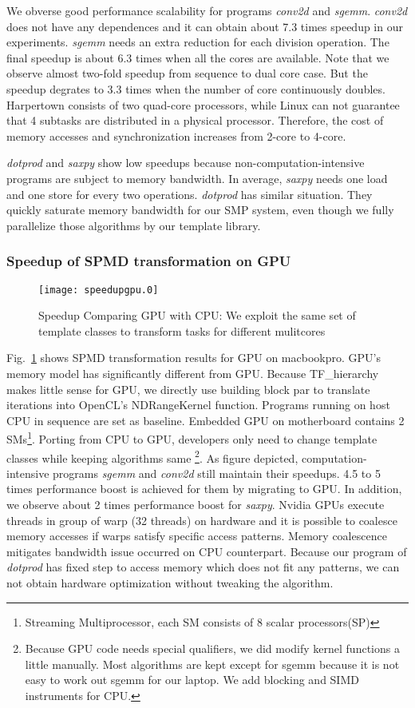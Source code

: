 We obverse good performance scalability for programs
\textit{conv2d} and \textit{sgemm}. \textit{conv2d} does not have any dependences
and it can obtain about 7.3 times speedup in our experiments. \textit{sgemm}
needs an extra reduction for each division operation. The final
speedup is about 6.3 times when all the cores are available. Note that we
observe almost two-fold speedup from sequence to dual core case. But
the speedup degrates to 3.3 times when the number of core continuously
doubles. Harpertown consists of two quad-core processors,  while Linux
can not guarantee that 4 subtasks are distributed in a physical
processor. Therefore, the cost of memory accesses and synchronization
increases from 2-core to 4-core.

\textit{dotprod} and \textit{saxpy} show low speedups because non-computation-intensive
programs are subject to memory bandwidth.  In average, \textit{saxpy} needs one load and one 
store for every two operations. \textit{dotprod} has similar
situation. They quickly saturate memory bandwidth for our SMP system, even though we fully parallelize those
algorithms by our template library. 

\subsubsection{Speedup of  SPMD transformation on GPU}\label{exp:2}
\begin{figure}
\texttt{[image: speedupgpu.0]}
\caption{Speedup Comparing GPU with CPU: We exploit the same set of
  template classes to transform tasks for different mulitcores}\label{fig:spdgpu}
\end{figure}

Fig.~\ref{fig:spdgpu} shows SPMD transformation results for GPU on
macbookpro. GPU's memory model has significantly different from
GPU. Because TF\_hierarchy makes little sense for GPU, we directly use building
block par to translate iterations into OpenCL's NDRangeKernel
function. Programs running on host CPU  in sequence are set as
baseline. Embedded GPU on motherboard contains 2
SMs\footnote{Streaming Multiprocessor, each SM consists of 8 scalar processors(SP)}.
Porting from CPU to GPU, developers only need to change
template classes while keeping algorithms same \footnote{
Because GPU code needs special qualifiers, we did modify kernel
functions a little manually.  Most algorithms are kept except for
sgemm because it is not easy
 to work out sgemm for our laptop.  We add blocking and SIMD
 instruments for CPU.}. As figure depicted,  computation-intensive programs
\textit{sgemm} and \textit{conv2d} still maintain their speedups. 4.5 to 5 times
performance boost is achieved for them by migrating to GPU.
In addition, we observe about 2 times performance boost for
\textit{saxpy}. Nvidia GPUs execute
threads in group of warp (32 threads) on hardware and it is
possible to coalesce memory accesses if warps satisfy
specific access patterns. Memory coalescence mitigates bandwidth issue
occurred on CPU counterpart. Because our program of \textit{dotprod} has fixed
step to access memory which does not fit any patterns, we can not
obtain hardware optimization without tweaking the algorithm.

